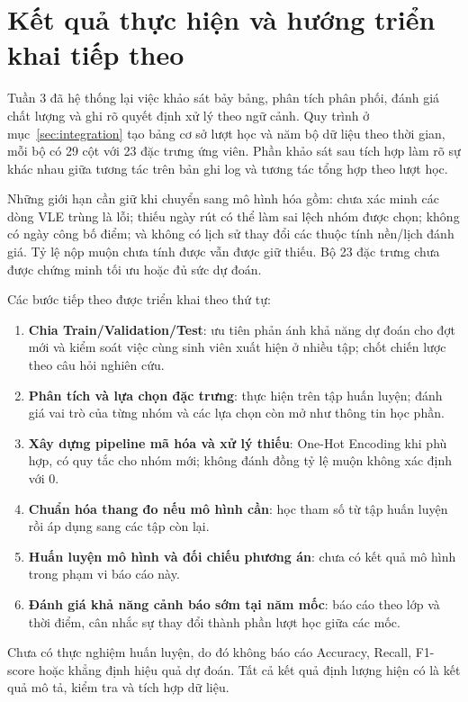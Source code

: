 \chapter*{Kết quả thực hiện và hướng triển khai tiếp theo}
{}

Tuần 3 đã hệ thống lại việc khảo sát bảy bảng, phân tích phân phối, đánh giá chất lượng và ghi rõ quyết định xử lý theo ngữ cảnh. Quy trình ở mục~\ref{sec:integration} tạo bảng cơ sở \NEnrollments{} lượt học và năm bộ dữ liệu theo thời gian, mỗi bộ có 29 cột với 23 đặc trưng ứng viên. Phần khảo sát sau tích hợp làm rõ sự khác nhau giữa tương tác trên bản ghi log và tương tác tổng hợp theo lượt học.

Những giới hạn cần giữ khi chuyển sang mô hình hóa gồm: chưa xác minh các dòng VLE trùng là lỗi; thiếu ngày rút có thể làm sai lệch nhóm được chọn; không có ngày công bố điểm; và không có lịch sử thay đổi các thuộc tính nền/lịch đánh giá. Tỷ lệ nộp muộn chưa tính được vẫn được giữ thiếu. Bộ 23 đặc trưng chưa được chứng minh tối ưu hoặc đủ sức dự đoán.

Các bước tiếp theo được triển khai theo thứ tự:
\begin{enumerate}
\item \textbf{Chia Train/Validation/Test}: ưu tiên phản ánh khả năng dự đoán cho đợt mới và kiểm soát việc cùng sinh viên xuất hiện ở nhiều tập; chốt chiến lược theo câu hỏi nghiên cứu.
\item \textbf{Phân tích và lựa chọn đặc trưng}: thực hiện trên tập huấn luyện; đánh giá vai trò của từng nhóm và các lựa chọn còn mở như thông tin học phần.
\item \textbf{Xây dựng pipeline mã hóa và xử lý thiếu}: One-Hot Encoding khi phù hợp, có quy tắc cho nhóm mới; không đánh đồng tỷ lệ muộn không xác định với 0.
\item \textbf{Chuẩn hóa thang đo nếu mô hình cần}: học tham số từ tập huấn luyện rồi áp dụng sang các tập còn lại.
\item \textbf{Huấn luyện mô hình và đối chiếu phương án}: chưa có kết quả mô hình trong phạm vi báo cáo này.
\item \textbf{Đánh giá khả năng cảnh báo sớm tại năm mốc}: báo cáo theo lớp và thời điểm, cân nhắc sự thay đổi thành phần lượt học giữa các mốc.
\end{enumerate}

Chưa có thực nghiệm huấn luyện, do đó không báo cáo Accuracy, Recall, F1-score hoặc khẳng định hiệu quả dự đoán. Tất cả kết quả định lượng hiện có là kết quả mô tả, kiểm tra và tích hợp dữ liệu.
